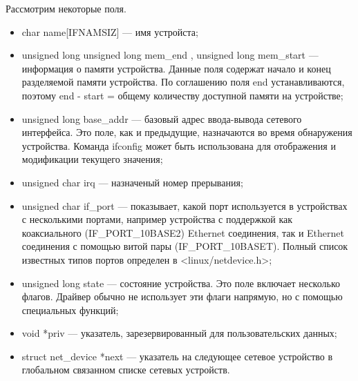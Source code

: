 \documentclass[14pt, a4paper]{extarticle}
\begin{document}
Рассмотрим некоторые поля.
\begin{itemize}
\item char name[IFNAMSIZ] --- имя устройста;

\item unsigned long unsigned long mem\_end , unsigned long mem\_start --- информация о памяти устройства. Данные поля содержат начало и конец разделяемой памяти устройства. По соглашению поля end устанавливаются, поэтому end - start = общему количеству доступной памяти на устройстве;

\item unsigned long base\_addr --- базовый адрес ввода-вывода сетевого интерфейса. Это поле, как и предыдущие, назначаются во время обнаружения устройства. Команда ifconfig может быть использована для отображения и модификации текущего значения;

\item unsigned char irq --- назначеный номер прерывания;

\item unsigned char if\_port --- показывает, какой порт используется в устройствах с несколькими портами, например устройства с поддержкой как коаксиального (IF\_PORT\_10BASE2) Ethernet соединения, так и Ethernet соединения с помощью витой пары (IF\_PORT\_10BASET). Полный список известных типов портов определен в <linux/netdevice.h>;

\item unsigned long state --- состояние устройства. Это поле включает несколько флагов. Драйвер обычно не использует эти флаги напрямую, но с помощью специальных функций;

\item void *priv --- указатель, зарезервированный для пользовательских данных;

\item struct net\_device *next --- указатель на следующее сетевое устройство в глобальном связанном списке сетевых устройств.

\end{itemize}
\end{document}
